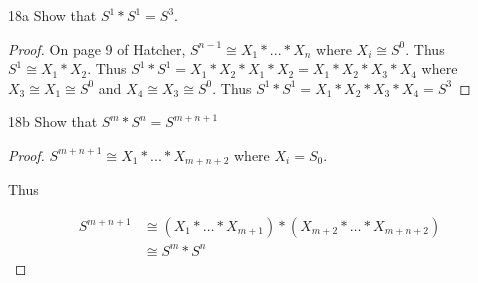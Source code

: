 \documentclass{article}
\begin{document}
\bigskip

\begin{claim}{18a}\label{Claim 18a.}
    Show that $S^1 \ast S^1 = S^3$.  
\end{claim}
\begin{proof}
    On page 9 of Hatcher, $S^{n - 1} \cong X_1 \ast ... \ast X_n$ where $X_i \cong S^0$. Thus $S^1 \cong X_1 \ast X_2$. Thus $S^1 \ast S^1 = X_1 \ast X_2 \ast X_1 \ast X_2 = X_1 \ast X_2 \ast X_3 \ast X_4$ where $X_3 \cong X_1 \cong S^0$ and $X_4 \cong X_3 \cong S^0$. Thus $S^1 \ast S^1 = X_1 \ast X_2 \ast X_3 \ast X_4 = S^3$       
\end{proof}
\begin{claim}{18b}\label{Claim 18b.}
    Show that $S^m \ast S^n = S^{m + n + 1}$ 
\end{claim}
\begin{proof}
    $S^{m + n + 1} \cong X_1 \ast ... \ast X_{m + n + 2}$ where $X_i = S_0$. 

    Thus 

    \begin{align*}
        S^{m + n + 1} &\cong (X_1 \ast \dots \ast X_{m + 1}) \ast (X_{m + 2} \ast \dots \ast X_{m + n + 2}) \\
        &\cong S^m \ast S^n
    \end{align*}
\end{proof}

\bigskip
\end{document}
